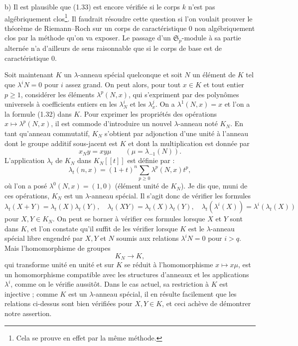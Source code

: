 \documentclass[11pt]{article}
\begin{document}
b) Il est plausible que (1.33) est encore vérifiée si le corps $k$ n'est pas algébriquement clos\footnote{Cela se prouve en effet par la même méthode.}. Il faudrait résoudre cette question si l'on voulait prouver le théorème de Riemann--Roch sur un corps de caractéristique $0$ non algébriquement clos par la méthode qu'on va exposer. Le passage d'un $\mathfrak S_p$-module à sa partie alternée n'a d'ailleurs de sens raisonnable que si le corps de base est de caractéristique $0$.

Soit maintenant $K$ un $\lambda$-anneau spécial quelconque et soit $N$ un élément de $K$ tel que $\lambda^iN=0$ pour $i$ assez grand. On peut alors, pour tout $x\in K$ et tout entier $p\geq1$, considérer les éléments $\lambda^p(N,x)$, qui s'expriment par des polynômes universels à coefficients entiers en les $\lambda_N^i$ et les $\lambda_x^j$. On a $\lambda^1(N,x)=x$ et l'on a la formule (1.32) dans $K$. Pour exprimer les propriétés des opérations $x\mapsto\lambda^p(N,x)$, il est commode d'introduire un nouvel $\lambda$-anneau noté $K_N$. En tant qu'anneau commutatif, $K_N$ s'obtient par adjonction d'une unité à l'anneau dont le groupe additif sous-jacent est $K$ et dont la multiplication est donnée par
\begin{equation}\tag{1.34}
x_Ny=xy\mu\qquad (\mu=\lambda_{-1}(N)).
\end{equation}
L'application $\lambda_t$ de $K_N$ dans $K_N[[t]]$ est définie par :
\begin{equation}\tag{1.35}
\lambda_t(n,x)=(1+t)^n\sum_{p\geq0}\lambda^p(N,x)t^p,
\end{equation}
où l'on a posé $\lambda^0(N,x)=(1,0)$ (élément unité de $K_N$). Je dis que, muni de ces opérations, $K_N$ est un $\lambda$-anneau spécial. Il s'agit donc de vérifier les formules
\[
\lambda_t(X+Y)=\lambda_t(X)\lambda_t(Y),\quad
\lambda_t(XY)=\lambda_t(X)\lambda_t(Y),\quad
\lambda_t(\lambda^i(X))=\lambda^i(\lambda_t(X))
\]
pour $X,Y\in K_N$. On peut se borner à vérifier ces formules lorsque $X$ et $Y$ sont dans $K$, et l'on constate qu'il suffit de les vérifier lorsque $K$ est le $\lambda$-anneau spécial libre engendré par $X,Y$ et $N$ soumis aux relations $\lambda^iN=0$ pour $i>q$. Mais l'homomorphisme de groupes
\begin{equation}\tag{1.36}
K_N\longrightarrow K,
\end{equation}
qui transforme unité en unité et sur $K$ se réduit à l'homomorphisme $x\mapsto x\mu$, est un homomorphisme compatible avec les structures d'anneaux et les applications $\lambda^i$, comme on le vérifie aussitôt. Dans le cas actuel, sa restriction à $K$ est injective ; comme $K$ est un $\lambda$-anneau spécial, il en résulte facilement que les relations ci-dessus sont bien vérifiées pour $X,Y\in K$, et ceci achève de démontrer notre assertion.
\end{document}
